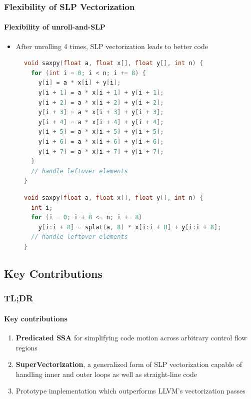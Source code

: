 \documentclass[aspectratio=169]{beamer}
\begin{document}
\begin{frame}[fragile]
  \frametitle{Flexibility of SLP Vectorization}
  \framesubtitle{Flexibility of unroll-and-SLP}

  \begin{itemize}
    \item After unrolling 4 times, SLP vectorization leads to better code
  \end{itemize}
  \begin{figure}
    \centering
    \begin{minipage}{.45\textwidth}
      \begin{lstlisting}[language=C]
void saxpy(float a, float x[], float y[], int n) {
  for (int i = 0; i < n; i += 8) {
    y[i] = a * x[i] + y[i];
    y[i + 1] = a * x[i + 1] + y[i + 1];
    y[i + 2] = a * x[i + 2] + y[i + 2];
    y[i + 3] = a * x[i + 3] + y[i + 3];
    y[i + 4] = a * x[i + 4] + y[i + 4];
    y[i + 5] = a * x[i + 5] + y[i + 5];
    y[i + 6] = a * x[i + 6] + y[i + 6];
    y[i + 7] = a * x[i + 7] + y[i + 7];
  }
  // handle leftover elements
}
      \end{lstlisting}
    \end{minipage}
    \hspace{0.2cm}
    \pause
    \begin{minipage}{.45\textwidth}
      \begin{lstlisting}[language=C]
void saxpy(float a, float x[], float y[], int n) {
  int i;
  for (i = 0; i + 8 <= n; i += 8)
    y[i:i + 8] = splat(a, 8) * x[i:i + 8] + y[i:i + 8];
  // handle leftover elements
}
      \end{lstlisting}
    \end{minipage}
  \end{figure}
\end{frame}

\subsection{Key Contributions}
\begin{frame}
  \frametitle{TL;DR}
  \framesubtitle{Key contributions}

  \begin{enumerate}
    \item {\bfseries Predicated SSA} for simplifying code motion across arbitrary control flow regions
    \item {\bfseries SuperVectorization}, a generalized form of SLP vectorization capable of handling inner and outer loops as well as straight-line code
    \item Prototype implementation which outperforms LLVM's vectorization passes
  \end{enumerate}
\end{frame}
\end{document}
